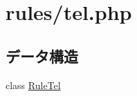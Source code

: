 \hypertarget{tel_8php}{
\section{rules/tel.php}
\label{tel_8php}
}
\subsection*{データ構造}
\begin{DoxyCompactItemize}
\item 
class \hyperlink{class_rule_tel}{\-Rule\-Tel}
\end{DoxyCompactItemize}
